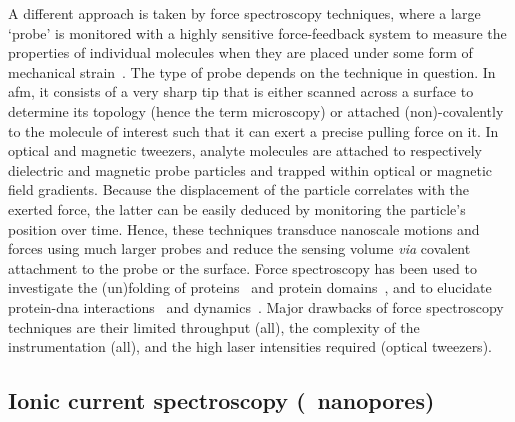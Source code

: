 A different approach is taken by force spectroscopy techniques, where a large `probe' is monitored with a
highly sensitive force-feedback system to measure the properties of individual molecules when they are placed
under some form of mechanical strain~\cite{Neuman-2008}. The type of probe depends on the technique in
question. In \gls{afm}, it consists of a very sharp tip that is either scanned across a surface to determine
its topology (hence the term microscopy) or attached (non)-covalently to the molecule of interest such that
it can exert a precise pulling force on it. In optical and magnetic tweezers, analyte molecules are attached
to respectively dielectric and magnetic probe particles and trapped within optical or magnetic field
gradients. Because the displacement of the particle correlates with the exerted force, the latter can be
easily deduced by monitoring the particle's position over time. Hence, these techniques transduce nanoscale
motions and forces using much larger probes and reduce the sensing volume \textit{via} covalent
attachment to the probe or the surface. Force spectroscopy has been used to investigate the (un)folding of
proteins~\cite{Bustamante-2020,Jagannathan-2013} and protein domains~\cite{Rief-1997,Kellermayer-1997}, and to
elucidate protein-\gls{dna} interactions~\cite{Abbondanzieri-2005,Shlyakhtenko-2007,Vanderlinden-2019} and
dynamics~\cite{Lyubchenko-2018,Brouns-2018}. Major drawbacks of force spectroscopy techniques are their
limited throughput (all), the complexity of the instrumentation (all), and the high laser intensities required
(optical tweezers).


\subsection{Ionic current spectroscopy (\ie~nanopores)}
%

